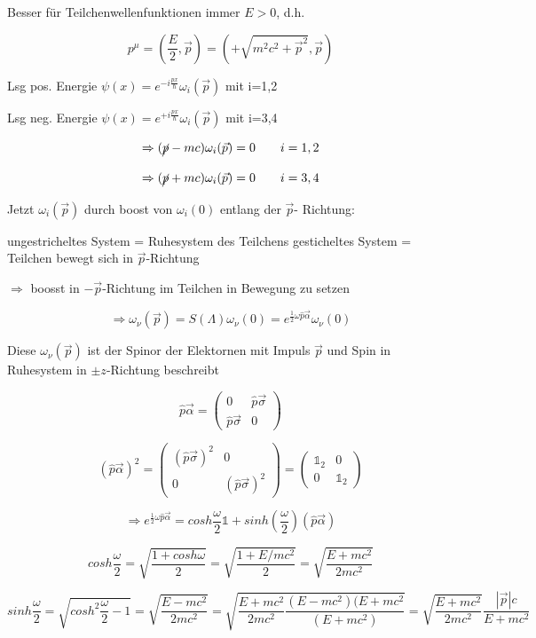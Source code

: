 Besser für Teilchenwellenfunktionen immer \(E>0\), d.h.

\[p^\mu = (\frac{E}{2},\vec p) = (+\sqrt{m^2c^2+\vec p^2},\vec p)\]

Lsg pos. Energie \(\psi(x) = e^{-i\frac{px}{\hbar}}\omega_i(\vec p)\) mit i=1,2

Lsg neg. Energie \(\psi(x) = e^{+i\frac{px}{\hbar}}\omega_i(\vec p)\) mit i=3,4

\[\Rightarrow (\cancel p -mc) \omega_i(\vec p) = 0 \qquad i=1,2\]

\[\Rightarrow (\cancel p +mc) \omega_i(\vec p) = 0 \qquad i=3,4\]

Jetzt \(\omega_i(\vec p)\) durch boost von \(\omega_i(0)\) entlang der \(\vec p\)- Richtung:

ungestricheltes System = Ruhesystem des Teilchens
gesticheltes System = Teilchen bewegt sich in \(\vec p \)-Richtung

\(\Rightarrow \) boosst in \(-\vec p\)-Richtung im Teilchen in Bewegung zu setzen

\[\Rightarrow \omega_\nu(\vec p) = S(\Lambda)\omega_\nu(0) = e^{\frac{1}{2}\omega\hat p\vec\alpha}\omega_\nu(0)  \]

Diese \(\omega_\nu(\vec p)\) ist der Spinor der Elektornen mit Impuls \(\vec p\) und Spin in Ruhesystem in \(\pm z\)-Richtung beschreibt

\[\hat p\vec \alpha = \begin{pmatrix} 0& \hat p\vec\sigma \\ \hat p\vec \sigma& 0 \end{pmatrix} \]

\[ (\hat p\vec \alpha)^2 = \begin{pmatrix} (\hat p\vec\sigma)^2&0 \\0& (\hat p\vec \sigma)^2 \end{pmatrix} =  \begin{pmatrix} \mathbb 1_2&0 \\0& \mathbb 1_2 \end{pmatrix}  \]

\[\Rightarrow e^{\frac{1}{2}\omega\hat p\vec\alpha} = cosh\frac{\omega}{2}\mathbb 1 + sinh(\frac{\omega}{2})(\hat p\vec \alpha)\]

\[cosh\frac{\omega}{2} = \sqrt{\frac{1+cosh\omega}{2}} = \sqrt{\frac{1+E/mc^2}{2}} =  \sqrt{\frac{E+mc^2}{2mc^2}} \]


\[sinh\frac{\omega}{2} = \sqrt{cosh^2\frac{\omega}{2}-1} =  \sqrt{\frac{E-mc^2}{2mc^2}} =  \sqrt{\frac{E+mc^2}{2mc^2} \frac{(E-mc^2)(E+mc^2}{(E+mc^2)} } = \sqrt{\frac{E+mc^2}{2mc^2}} \frac{|\vec p|c}{E+mc^2}   \]

